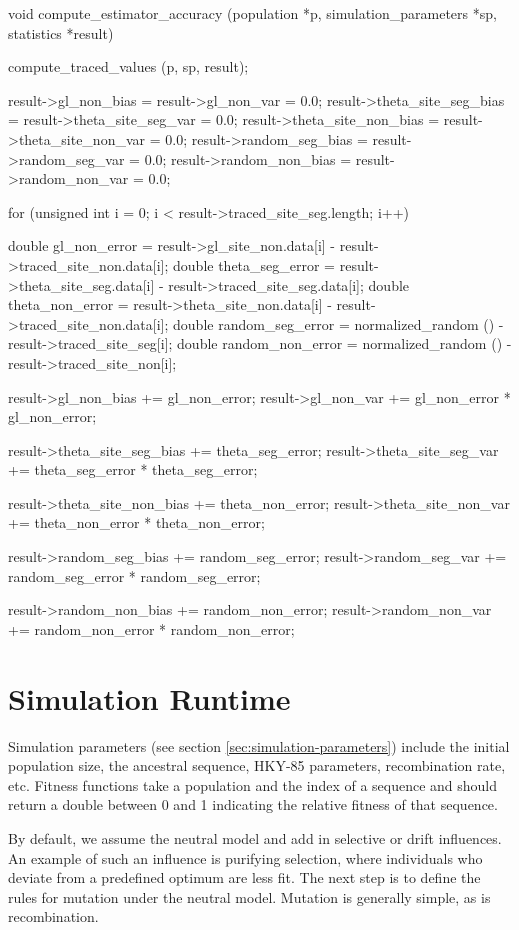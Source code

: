 \documentclass{article}
\begin{document}
\begin{ccode}
void compute_estimator_accuracy (population *p, simulation_parameters *sp, statistics *result) {
  compute_traced_values (p, sp, result);

  result->gl_non_bias		= result->gl_non_var		= 0.0;
  result->theta_site_seg_bias	= result->theta_site_seg_var	= 0.0;
  result->theta_site_non_bias	= result->theta_site_non_var	= 0.0;
  result->random_seg_bias	= result->random_seg_var	= 0.0;
  result->random_non_bias	= result->random_non_var	= 0.0;

  for (unsigned int i = 0; i < result->traced_site_seg.length; i++) {
    double gl_non_error		= result->gl_site_non.data[i] - result->traced_site_non.data[i];
    double theta_seg_error	= result->theta_site_seg.data[i] - result->traced_site_seg.data[i];
    double theta_non_error	= result->theta_site_non.data[i] - result->traced_site_non.data[i];
    double random_seg_error	= normalized_random () - result->traced_site_seg[i];
    double random_non_error	= normalized_random () - result->traced_site_non[i];

    result->gl_non_bias		+= gl_non_error;
    result->gl_non_var		+= gl_non_error * gl_non_error;

    result->theta_site_seg_bias += theta_seg_error;
    result->theta_site_seg_var	+= theta_seg_error * theta_seg_error;

    result->theta_site_non_bias	+= theta_non_error;
    result->theta_site_non_var	+= theta_non_error * theta_non_error;

    result->random_seg_bias	+= random_seg_error;
    result->random_seg_var	+= random_seg_error * random_seg_error;

    result->random_non_bias	+= random_non_error;
    result->random_non_var	+= random_non_error * random_non_error;
  }
}
\end{ccode}

  \section{Simulation Runtime}

    Simulation parameters (see section \ref{sec:simulation-parameters}) include
    the initial population size, the ancestral sequence, HKY-85 parameters,
    recombination rate, etc. Fitness functions take a population and the index
    of a sequence and should return a double between 0 and 1 indicating the
    relative fitness of that sequence.

    By default, we assume the neutral model and add in selective or drift
    influences. An example of such an influence is purifying selection, where
    individuals who deviate from a predefined optimum are less fit. The next
    step is to define the rules for mutation under the neutral model. Mutation
    is generally simple, as is recombination.
\end{document}
